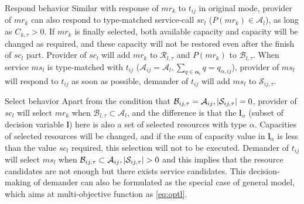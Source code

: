 \begin{asparaenum}
\item Respond behavior
Similar with response of $mr_k$ to $t_{ij}$ in original mode, provider of $mr_k$ can also respond to type-matched service-call $sc_l$ ($P(mr_k)\in\mathcal{A}_l$), as long as $C_{k,\tau}> 0$. If $mr_k$ is finally selected, both available capacity and capacity will be changed as required, and these capacity will not be restored even after the finish of $sc_l$ part. Provider of $sc_l$ will add $mr_k$ to $\mathcal{R}_{l,\tau}$ and $P(mr_k)$ to $\mathcal{B}_{l,\tau}$. When service $ms_l$ is type-matched with $t_{ij}$ ($\mathcal{A}_{ij} =\mathcal{A}_l,\sum_{q\in\bm{\alpha}_l} q = q_{\alpha,ij}$), provider of $ms_l$ will respond to $t_{ij}$ as soon as possible, demander of $t_{ij}$ will add $ms_l$ to $\mathcal{S}_{ij,\tau}$.



\item Select behavior
Apart from the condition that $\mathcal{B}_{ij,\tau} = \mathcal{A}_{ij},\left|\mathcal{S}_{ij,\tau}\right|=0$, provider of $sc_l$ will select $mr_k$ when $\mathcal{B}_{l,\tau}\subset\mathcal{A}_l$, and the difference is that the $\bm{l}_{\alpha}$ (subset of decision variable $\bm{l}$) here is also a set of selected resources with type $\alpha$. Capacities of selected resources will be changed, and if the sum of capacity value in $\bm{l}_{\alpha}$ is less than the value $sc_l$ required, this selection will not to be executed.
Demander of $t_{ij}$ will select $ms_l$ when $\mathcal{B}_{ij,\tau}\subset\mathcal{A}_{ij},\abs{\mathcal{S}_{ij,\tau}}>0$ and this implies that the resource candidates are not enough but there exists service candidates.
This decision-making of demander can also be formulated as the special case of general model, which aims at multi-objective function as \autoref{eq:optl}.


\end{asparaenum}
